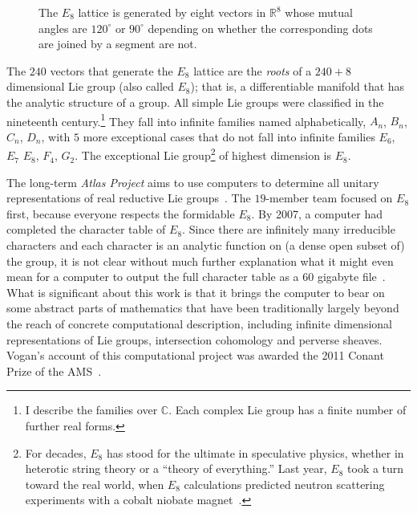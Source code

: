 \documentclass{llncs}
\newcommand{\ring}[1]{\mathbb{#1}}
\begin{document}

\begin{figure}[h!]
  \centering
\figEE
\caption{The $E_8$ lattice is generated by eight vectors in
  $\ring{R}^8$ whose mutual angles are $120^\circ$ or $90^\circ$
  depending on whether the corresponding dots are joined by a
  segment are not.}
\label{fig:e8}
\end{figure}


The $240$ vectors that generate the $E_8$ lattice are the {\it roots}
of a $240+8$ dimensional Lie group (also called $E_8$); that is, a
differentiable manifold that has the analytic structure of a group.
All simple Lie groups were classified in the nineteenth
century.\footnote{I describe the families over $\ring{C}$.  Each
  complex Lie group has a finite number of further real forms.}  They
fall into infinite families named alphabetically, $A_n$, $B_n$, $C_n$,
$D_n$, with $5$ more exceptional cases that do not fall into infinite
families $E_6$, $E_7$ $E_8$, $F_4$, $G_2$.  The exceptional Lie
group\footnote{For decades, $E_8$ has stood for the ultimate in
  speculative physics, whether in heterotic string theory or a
  ``theory of everything.''  Last year, $E_8$ took a turn toward the
  real world, when $E_8$ calculations predicted neutron scattering
  experiments with a cobalt niobate magnet~\cite{BGE8}.} of highest
dimension is $E_8$.

The long-term {\it Atlas Project} aims to use computers to determine
all unitary representations of real reductive Lie groups~\cite{Atlas}.
The $19$-member team focused on $E_8$ first, because everyone respects
the formidable $E_8$.  By 2007, a computer had completed the character
table of $E_8$.  Since there are infinitely many irreducible
characters and each character is an analytic function on (a dense open
subset of) the group, it is not clear without much further explanation
what it might even mean for a computer to output the full character
table as a $60$ gigabyte file~\cite{AdChar}.  What is significant
about this work is that it brings the computer to bear on some
abstract parts of mathematics that have been traditionally largely
beyond the reach of concrete computational description, including
infinite dimensional representations of Lie groups, intersection
cohomology and perverse sheaves.  Vogan's account of this
computational project was awarded the 2011 Conant Prize of the
AMS~\cite{VE8}.
\end{document}
